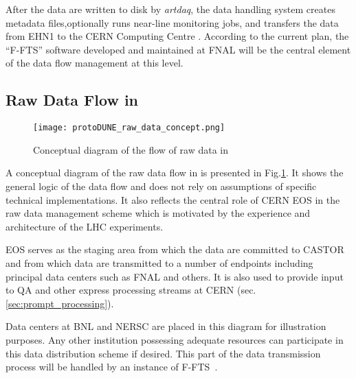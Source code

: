 
After the data are written to disk by {\it artdaq}, the data handling
system creates metadata files,optionally  runs near-line monitoring jobs, and
transfers the data from EHN1 to the CERN Computing Centre \cite{docdb1212}.
According to the current plan,
the ``F-FTS'' software 
developed and maintained at FNAL will be the central element
of the data flow management at this level.


\subsection{Raw Data Flow in \pd}
\label{sec:raw_concept}
\begin{figure}[tbh]
\centering\texttt{[image: protoDUNE\_raw\_data\_concept.png]}
\caption{\label{fig:raw_concept}Conceptual diagram of the flow of raw data in \pd}
\end{figure}

A conceptual diagram of the raw data flow in \pd is presented in Fig.\ref{fig:raw_concept}. It shows the general logic
of the data flow and does not rely on assumptions of specific technical implementations. 
It also reflects the central role of CERN EOS in the \pd raw data management scheme which is motivated by the experience
and architecture of the LHC experiments.

EOS serves as the staging area from which the data are committed to CASTOR
and from which data are transmitted to a number of endpoints including principal data centers such as FNAL and others.
It is also used to provide input to QA and other express processing streams at CERN (sec.\,\ref{sec:prompt_processing}).

Data centers at BNL and NERSC 
are placed in this diagram for illustration purposes. Any other institution possessing adequate
resources can participate in this data distribution scheme if desired.
 This part of the data transmission process will be handled by an instance of F-FTS~\cite{docdb1212}.



